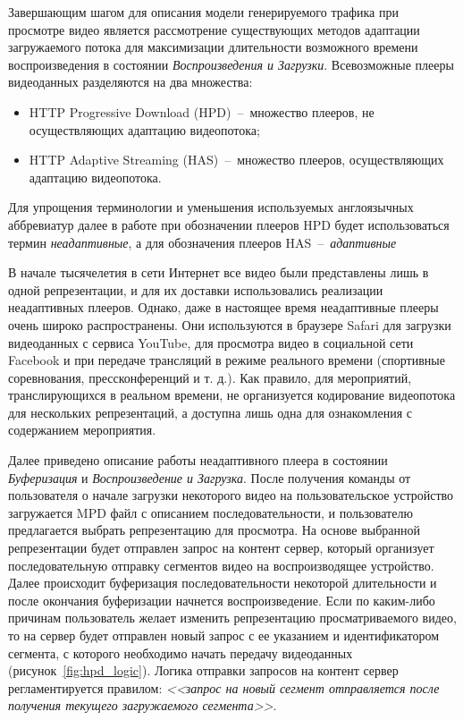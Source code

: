 Завершающим шагом для описания модели генерируемого трафика при просмотре видео является рассмотрение существующих методов адаптации загружаемого потока для максимизации длительности возможного времени воспроизведения в состоянии \textit{Воспроизведения и Загрузки}. Всевозможные плееры видеоданных разделяются на два множества:
\begin{itemize}
  \item HTTP Progressive Download (HPD)~--~множество плееров, не осуществляющих адаптацию видеопотока;
  \item HTTP Adaptive Streaming (HAS)~--~множество плееров, осуществляющих адаптацию видеопотока.
\end{itemize}
Для упрощения терминологии и уменьшения используемых англоязычных аббревиатур далее в работе при обозначении плееров HPD будет использоваться термин \textit{неадаптивные}, а для обозначения плееров HAS~--~\textit{адаптивные}

В начале тысячелетия в сети Интернет все видео были представлены лишь в одной репрезентации, и для их доставки использовались реализации неадаптивных плееров. Однако, даже в настоящее время неадаптивные плееры очень широко распространены. Они используются в браузере Safari для загрузки видеоданных с сервиса YouTube, для просмотра видео в социальной сети Facebook и при передаче трансляций в режиме реального времени (спортивные соревнования, прессконференций и т. д.). Как правило, для мероприятий, транслирующихся в реальном времени, не организуется кодирование видеопотока для нескольких репрезентаций, а доступна лишь одна для ознакомления с содержанием мероприятия.

Далее приведено описание работы неадаптивного плеера в состоянии \textit{Буферизация} и \textit{Воспроизведение и Загрузка}. После получения команды от пользователя о начале загрузки некоторого видео на пользовательское устройство загружается MPD файл с описанием последовательности, и пользователю предлагается выбрать репрезентацию для просмотра. На основе выбранной репрезентации будет отправлен запрос на контент сервер, который организует последовательную отправку сегментов видео на воспроизводящее устройство. Далее происходит буферизация последовательности некоторой длительности и после окончания буферизации начнется воспроизведение. Если по каким-либо причинам пользователь желает изменить репрезентацию просматриваемого видео, то на сервер будет отправлен новый запрос с ее указанием и идентификатором сегмента, с которого необходимо начать передачу видеоданных (рисунок~\ref{fig:hpd_logic}). Логика отправки запросов на контент сервер регламентируется правилом: \textit{<<запрос на новый сегмент отправляется после получения текущего загружаемого сегмента>>}.

